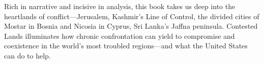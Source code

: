 Rich in narrative and incisive in analysis, this book takes us deep into the heartlands of conflict---Jerusalem, Kashmir’s Line of Control, the divided cities of Mostar in Bosnia and Nicosia in Cyprus, Sri Lanka’s Jaffna peninsula. Contested Lands illuminates how chronic confrontation can yield to compromise and coexistence in the world’s most troubled regions—and what the United States can do to help. \lorem\lorem\lorem

\lipsum[1-3]

